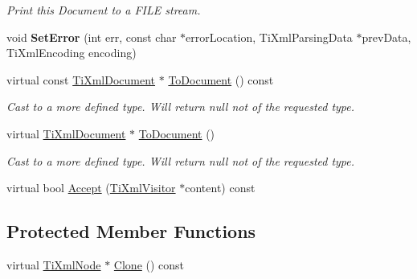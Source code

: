 \begin{DoxyCompactItemize}
\begin{DoxyCompactList}\small\item\em Print this Document to a F\-I\-L\-E stream. \end{DoxyCompactList}\item 
\hypertarget{class_ti_xml_document_a735c23e318597b920c94eae77fa206de}{void {\bfseries Set\-Error} (int err, const char $\ast$error\-Location, Ti\-Xml\-Parsing\-Data $\ast$prev\-Data, Ti\-Xml\-Encoding encoding)}\label{class_ti_xml_document_a735c23e318597b920c94eae77fa206de}

\item 
\hypertarget{class_ti_xml_document_a1dc977bde3e4fe85a8eb9d88a35ef5a4}{virtual const \hyperlink{class_ti_xml_document}{Ti\-Xml\-Document} $\ast$ \hyperlink{class_ti_xml_document_a1dc977bde3e4fe85a8eb9d88a35ef5a4}{To\-Document} () const }\label{class_ti_xml_document_a1dc977bde3e4fe85a8eb9d88a35ef5a4}

\begin{DoxyCompactList}\small\item\em Cast to a more defined type. Will return null not of the requested type. \end{DoxyCompactList}\item 
\hypertarget{class_ti_xml_document_a1025d942a1f328fd742d545e37efdd42}{virtual \hyperlink{class_ti_xml_document}{Ti\-Xml\-Document} $\ast$ \hyperlink{class_ti_xml_document_a1025d942a1f328fd742d545e37efdd42}{To\-Document} ()}\label{class_ti_xml_document_a1025d942a1f328fd742d545e37efdd42}

\begin{DoxyCompactList}\small\item\em Cast to a more defined type. Will return null not of the requested type. \end{DoxyCompactList}\item 
virtual bool \hyperlink{class_ti_xml_document_aa545aae325d9752ad64120bc4ecf939a}{Accept} (\hyperlink{class_ti_xml_visitor}{Ti\-Xml\-Visitor} $\ast$content) const 
\end{DoxyCompactItemize}
\subsection*{Protected Member Functions}
\begin{DoxyCompactItemize}
\item 
virtual \hyperlink{class_ti_xml_node}{Ti\-Xml\-Node} $\ast$ \hyperlink{class_ti_xml_document_a4968661cab4a1f44a23329c6f8db1907}{Clone} () const 
\end{DoxyCompactItemize}
